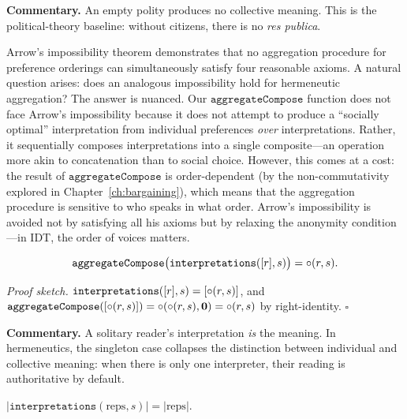 \medskip

\noindent\textbf{Commentary.}
An empty polity produces no collective meaning.  This is the political-theory
baseline: without citizens, there is no \textit{res publica}.

\begin{remark}
\label{rem:arrow_limits}
Arrow's impossibility theorem demonstrates that no aggregation procedure for
preference orderings can simultaneously satisfy four reasonable axioms.
A natural question arises: does an analogous impossibility hold for
hermeneutic aggregation?  The answer is nuanced.  Our
$\texttt{aggregateCompose}$ function does not face Arrow's impossibility
because it does not attempt to produce a ``socially optimal'' interpretation
from individual preferences \emph{over} interpretations.  Rather, it
sequentially composes interpretations into a single composite---an
operation more akin to concatenation than to social choice.  However, this
comes at a cost: the result of $\texttt{aggregateCompose}$ is
order-dependent (by the non-commutativity explored in
Chapter~\ref{ch:bargaining}), which means that the aggregation procedure
is sensitive to who speaks in what order.  Arrow's impossibility is avoided
not by satisfying all his axioms but by relaxing the anonymity
condition---in IDT, the order of voices matters.
\end{remark}


\begin{theorem}[Singleton = Individual Interpretation (19.2)]
\label{thm:singleton_interpretation}
\[
  \texttt{aggregateCompose}\bigl(\texttt{interpretations}([r], s)\bigr) = \circ(r, s).
\]
\end{theorem}

\noindent\textit{Proof sketch.}\quad
$\texttt{interpretations}([r], s) = [\circ(r,s)]$, and
$\texttt{aggregateCompose}([\circ(r,s)]) = \circ(\circ(r,s), \mathbf{0}) =
\circ(r,s)$ by right-identity.
\hfill$\square$

\medskip

\noindent\textbf{Commentary.}
A solitary reader's interpretation \emph{is} the meaning.  In hermeneutics,
the singleton case collapses the distinction between individual and
collective meaning: when there is only one interpreter, their reading is
authoritative by default.

\begin{theorem}[Interpretation Count = Agent Count (19.5)]
\label{thm:interpretation_count}
$|\texttt{interpretations}(\text{reps}, s)| = |\text{reps}|$.
\end{theorem}

